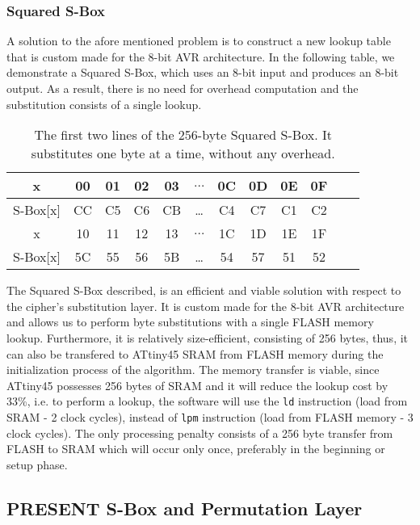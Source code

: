 \documentclass{llncs}
\begin{document}
\subsubsection{Squared S-Box}\label{ssbox}
A solution to the afore mentioned problem is to construct a new lookup table that is custom made for the 8-bit AVR architecture. In the following table, we demonstrate a Squared S-Box, which uses an 8-bit input and produces an 8-bit output. As a result, there is no need for overhead computation and the substitution consists of a single lookup.\\
\begin{table}[h]
\centering
\begin{tabular}{| c | c  | c | c | c  | c  | c | c | c  | c | c | c |}
\hline
  x & 00 & 01 & 02 & 03  &  $\dots$  & 0C & 0D & 0E & 0F   \\
\hline
 S-Box[x] & CC & C5 & C6 & CB & \dots & C4 & C7 & C1 & C2   \\
\hline
  x & 10 & 11 & 12 & 13  &  $\dots$  & 1C & 1D & 1E & 1F   \\
\hline
 S-Box[x] & 5C & 55 & 56 & 5B & \dots & 54 & 57 & 51 & 52   \\

\hline
\end{tabular}
 \caption{\small The first two lines of the 256-byte Squared S-Box. It substitutes one byte at a time, without any overhead.}
\end{table}
The Squared S-Box described, is an efficient and viable solution with respect to the cipher's substitution layer. It is custom made for the 8-bit AVR architecture and allows us to perform byte substitutions with a single FLASH memory lookup. Furthermore, it is relatively size-efficient, consisting of 256 bytes, thus, it can also be transfered to ATtiny45 SRAM from FLASH memory during the initialization process of the algorithm. The memory transfer is viable, since ATtiny45 possesses 256 bytes of SRAM and it will reduce the lookup cost by 33\%, i.e. to perform a lookup, the software will use the \texttt{ld} instruction (load from SRAM - 2 clock cycles), instead of  \texttt{lpm} instruction (load from FLASH memory - 3 clock cycles). The only processing penalty consists of a 256 byte transfer from FLASH to SRAM which will occur only once, preferably in the beginning or setup phase.
\subsection{PRESENT S-Box and Permutation Layer}
\end{document}
